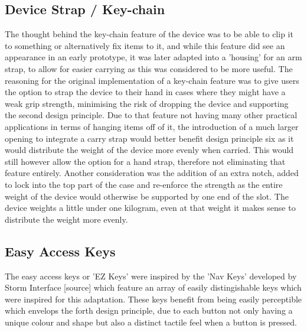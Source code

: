 
\subsection{Device Strap / Key-chain}

The thought behind the key-chain feature of the device was to be able to clip it to something or alternatively fix items to it, and while this feature did see an appearance in an early prototype, it was later adapted into a 'housing' for an arm strap, to allow for easier carrying as this was considered to be more useful.
The reasoning for the original implementation of a key-chain feature was to give users the option to strap the device to their hand in cases where they might have a weak grip strength, minimising the risk of dropping the device and supporting the second design principle.
Due to that feature not having many other practical applications in terms of hanging items off of it, the introduction of a much larger opening to integrate a carry strap would better benefit design principle six as it would distribute the weight of the device more evenly when carried.
This would still however allow the option for a hand strap, therefore not eliminating that feature entirely.
Another consideration was the addition of an extra notch, added to lock into the top part of the case and re-enforce the strength as the entire weight of the device would otherwise be supported by one end of the slot. %
The device weights a little under one kilogram, even at that weight it makes sense to distribute the weight more evenly.

\subsection{Easy Access Keys}

The easy access keys or 'EZ Keys' were inspired by the 'Nav Keys' developed by Storm Interface [source] which feature an array of easily distingishable keys which were inspired for this adaptation.
These keys benefit from being easily perceptible which envelops the forth design principle, due to each button not only having a unique colour and shape but also a distinct tactile feel when a button is pressed.

